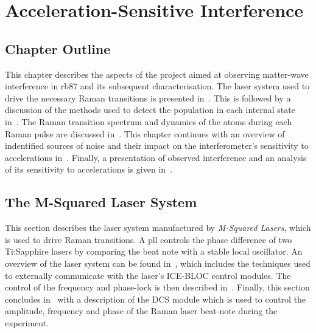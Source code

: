 \chapter{Acceleration-Sensitive Interference}\label{chap:atom_int}

\section{Chapter Outline}
This chapter describes the aspects of the project aimed at observing
matter-wave interference in \ac{rb87} and its subsequent
characterisation. The laser system used to drive the necessary Raman
transitions is presented in~. This is
followed by a discussion of the methods used to detect the population
in each internal state in~. The Raman
transition spectrum and
dynamics of the atoms during each Raman pulse are discussed
in~. This chapter continues
with an overview of indentified sources of noise and their impact on
the interferometer's sensitivity to accelerations
in~. Finally, a presentation of observed
interference and an analysis of its sensitivity to accelerations is
given in~.
\section{The M-Squared Laser System}\label{sec:msquared_laser} 
  This section describes the laser system manufactured by \textit{M-Squared
  Lasers}, which is used to drive Raman transitions. 
  A \ac{pll} controls the phase difference of two Ti:Sapphire lasers
  by comparing the beat note with a stable local oscillator\nocite{Lautier2014b}\nocite{Marino2008}. An overview of the laser
  system can be found in~, which includes
  the techniques used to externally communicate with the laser's ICE-BLOC
  control modules. The control of the frequency and phase-lock is then described
  in~. Finally, this section concludes
  in~ with a description of the DCS
  module which is used to control
  the amplitude, frequency and phase of the Raman laser beat-note
  during the experiment.
